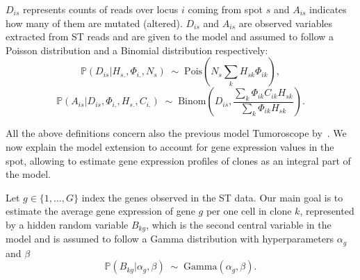 \documentclass[unnumsec,webpdf,contemporary,large]{oup-authoring-template}%
\theoremstyle{thmstyleone}%
\theoremstyle{thmstyletwo}%
\theoremstyle{thmstylethree}%
\begin{document}
\begin{methods}
$D_{is}$ represents counts of reads over locus $i$ coming from spot $s$ and $A_{is}$ indicates how many of them are mutated (altered). $D_{is}$ and $A_{is}$ are observed variables extracted from ST reads and are given to the model and assumed to follow a Poisson distribution and a Binomial distribution respectively:
$$\mathbb{P}(D_{is}|H_{s.},\Phi_{i.},N_s) \; \sim \; \mathrm{Pois} \left(N_s\sum_{k}{H_{sk}\Phi_{ik}}\right),$$
$$\mathbb{P}(A_{is}|D_{is},\Phi_{i.},H_{s.},C_{i.}) \; \sim \; \mathrm{Binom} \left(D_{is},\frac{\sum_{k}\Phi_{ik}C_{ik}H_{sk}}{\sum_{k}\Phi_{ik}H_{sk}}\right).$$

All the above definitions concern also the previous model Tumoroscope by~\cite{shafighi2024integrative}. We now explain the model extension to account for gene expression values in the spot, allowing to estimate gene expression profiles of clones as an integral part of the model.

Let $g \in \{1, \ldots, G\}$ index the genes observed in the ST data. Our main goal is to estimate the average gene expression of gene $g$ per one cell in clone $k$, represented by a hidden random variable $B_{kg}$, which is the second central variable in the model and is assumed to follow a Gamma distribution with hyperparameters $\alpha_{g}$ and $\beta$
$$\mathbb{P}(B_{kg}|\alpha_{g},\beta) \; \sim \; \mathrm{Gamma}(\alpha_{g},\beta).$$


\end{methods}
\end{document}
